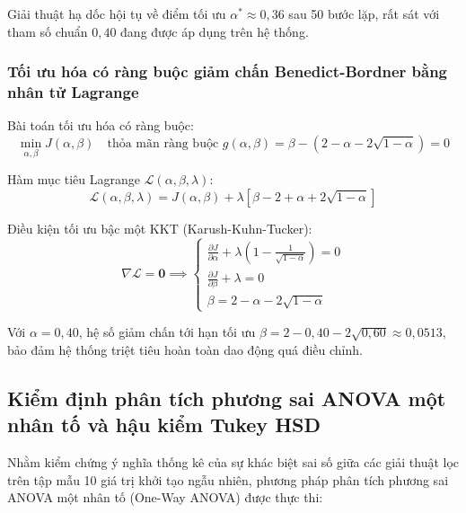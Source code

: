 Giải thuật hạ dốc hội tụ về điểm tối ưu $\alpha^* \approx 0{,}36$ sau 50 bước lặp, rất sát với tham số chuẩn $0{,}40$ đang được áp dụng trên hệ thống.

\subsubsection{Tối ưu hóa có ràng buộc giảm chấn Benedict-Bordner bằng nhân tử Lagrange}

\hspace{0.5cm} Bài toán tối ưu hóa có ràng buộc:
\begin{equation}
\min_{\alpha, \beta} J(\alpha, \beta) \quad \text{thỏa mãn ràng buộc } g(\alpha, \beta) = \beta - \left( 2 - \alpha - 2\sqrt{1-\alpha} \right) = 0
\label{eq:lagrange-constrained-problem}
\end{equation}

Hàm mục tiêu Lagrange $\mathcal{L}(\alpha, \beta, \lambda)$:
\begin{equation}
\mathcal{L}(\alpha, \beta, \lambda) = J(\alpha, \beta) + \lambda \left[ \beta - 2 + \alpha + 2\sqrt{1-\alpha} \right]
\label{eq:lagrangian-function-formula}
\end{equation}

Điều kiện tối ưu bậc một KKT (Karush-Kuhn-Tucker):
\begin{equation}
\nabla \mathcal{L} = \mathbf{0} \implies \begin{cases}
\frac{\partial J}{\partial \alpha} + \lambda \left( 1 - \frac{1}{\sqrt{1-\alpha}} \right) = 0 \\
\frac{\partial J}{\partial \beta} + \lambda = 0 \\
\beta = 2 - \alpha - 2\sqrt{1-\alpha}
\end{cases}
\label{eq:kkt-optimality-conditions}
\end{equation}

Với $\alpha = 0{,}40$, hệ số giảm chấn tới hạn tối ưu $\beta = 2 - 0{,}40 - 2\sqrt{0{,}60} \approx 0{,}0513$, bảo đảm hệ thống triệt tiêu hoàn toàn dao động quá điều chỉnh.

\subsection{Kiểm định phân tích phương sai ANOVA một nhân tố và hậu kiểm Tukey HSD}

\hspace{0.5cm} Nhằm kiểm chứng ý nghĩa thống kê của sự khác biệt sai số giữa các giải thuật lọc trên tập mẫu 10 giá trị khởi tạo ngẫu nhiên, phương pháp phân tích phương sai ANOVA một nhân tố (One-Way ANOVA) được thực thi:

